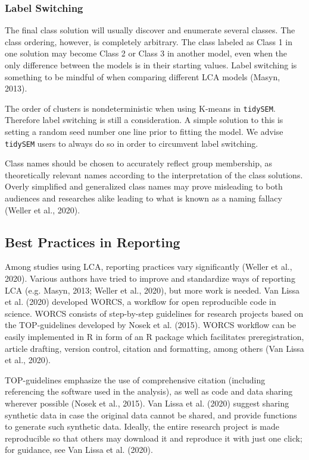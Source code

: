 \documentclass[
  ,man,floatsintext]{apa6}
\begin{document}
\hypertarget{label-switching}{%
\subsubsection{Label Switching}\label{label-switching}}

The final class solution will usually discover and enumerate several
classes. The class ordering, however, is completely arbitrary. The class
labeled as Class 1 in one solution may become Class 2 or Class 3 in
another model, even when the only difference between the models is in
their starting values. Label switching is something to be mindful of
when comparing different LCA models (Masyn, 2013).

The order of clusters is nondeterministic when using K-means in
\texttt{tidySEM}. Therefore label switching is still a consideration. A simple
solution to this is setting a random seed number one line prior to
fitting the model. We advise \texttt{tidySEM} users to always do so in order to
circumvent label switching.

Class names should be chosen to accurately reflect group membership, as theoretically relevant names according to the interpretation of the class solutions.
Overly simplified and generalized class names may prove misleading to
both audiences and researches alike leading to what is known as a naming
fallacy (Weller et al., 2020).

\hypertarget{best-practices-in-reporting}{%
\subsection{Best Practices in Reporting}\label{best-practices-in-reporting}}

Among studies using LCA, reporting practices vary significantly
(Weller et al., 2020). Various authors have tried to improve and
standardize ways of reporting LCA (e.g. Masyn, 2013; Weller et al., 2020), but more work is needed. Van Lissa et al. (2020)
developed WORCS, a workflow for open reproducible code in science. WORCS
consists of step-by-step guidelines for research projects based on the
TOP-guidelines developed by Nosek et al. (2015). WORCS workflow can be
easily implemented in R in form of an R package which facilitates
preregistration, article drafting, version control, citation and
formatting, among others (Van Lissa et al., 2020).

TOP-guidelines emphasize the use of comprehensive citation (including
referencing the software used in the analysis), as well as code and data
sharing wherever possible (Nosek et al., 2015). Van Lissa et al. (2020)
suggest sharing synthetic data in case the original data cannot be
shared, and provide functions to generate such synthetic data. Ideally,
the entire research project is made reproducible so that others may
download it and reproduce it with just one click; for guidance, see
Van Lissa et al. (2020).
\end{document}
